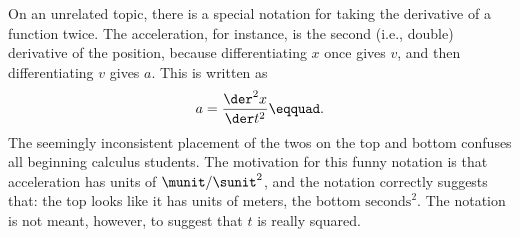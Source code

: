 On an unrelated topic, there is a special notation for
taking the derivative of a function twice. The acceleration,
for instance, is the second (i.e., double) derivative
of the position, because differentiating $x$ once gives $v$,
and then differentiating $v$ gives $a$. This is written as
\begin{equation*}
   a = \frac{\der^2 x}{\der t^2}\eqquad.
\end{equation*}
The seemingly inconsistent placement of the twos on the top
and bottom confuses all beginning calculus students. The
motivation for this funny notation is that acceleration has
units of $\munit/\sunit^2$, and the notation correctly suggests that:
the top looks like it has units of meters, the bottom
$\text{seconds}^2$. The notation is not meant, however, to suggest
that $t$ is really squared.


